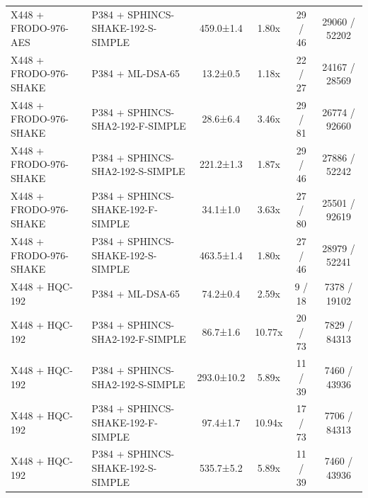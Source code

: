 \documentclass[10pt]{article}
\begin{document}
\begin{tabular}{@{}l l c c c c@{}}
X448 + FRODO-976-AES & P384 + SPHINCS-SHAKE-192-S-SIMPLE & 459.0±1.4 & 1.80x & 29 / 46 & 29060 / 52202 \\
X448 + FRODO-976-SHAKE & P384 + ML-DSA-65 & 13.2±0.5 & 1.18x & 22 / 27 & 24167 / 28569 \\
X448 + FRODO-976-SHAKE & P384 + SPHINCS-SHA2-192-F-SIMPLE & 28.6±6.4 & 3.46x & 29 / 81 & 26774 / 92660 \\
X448 + FRODO-976-SHAKE & P384 + SPHINCS-SHA2-192-S-SIMPLE & 221.2±1.3 & 1.87x & 29 / 46 & 27886 / 52242 \\
X448 + FRODO-976-SHAKE & P384 + SPHINCS-SHAKE-192-F-SIMPLE & 34.1±1.0 & 3.63x & 27 / 80 & 25501 / 92619 \\
X448 + FRODO-976-SHAKE & P384 + SPHINCS-SHAKE-192-S-SIMPLE & 463.5±1.4 & 1.80x & 27 / 46 & 28979 / 52241 \\
X448 + HQC-192 & P384 + ML-DSA-65 & 74.2±0.4 & 2.59x & 9 / 18 & 7378 / 19102 \\
X448 + HQC-192 & P384 + SPHINCS-SHA2-192-F-SIMPLE & 86.7±1.6 & 10.77x & 20 / 73 & 7829 / 84313 \\
X448 + HQC-192 & P384 + SPHINCS-SHA2-192-S-SIMPLE & 293.0±10.2 & 5.89x & 11 / 39 & 7460 / 43936 \\
X448 + HQC-192 & P384 + SPHINCS-SHAKE-192-F-SIMPLE & 97.4±1.7 & 10.94x & 17 / 73 & 7706 / 84313 \\
X448 + HQC-192 & P384 + SPHINCS-SHAKE-192-S-SIMPLE & 535.7±5.2 & 5.89x & 11 / 39 & 7460 / 43936 \\
\bottomrule
\end{tabular}
\end{document}
